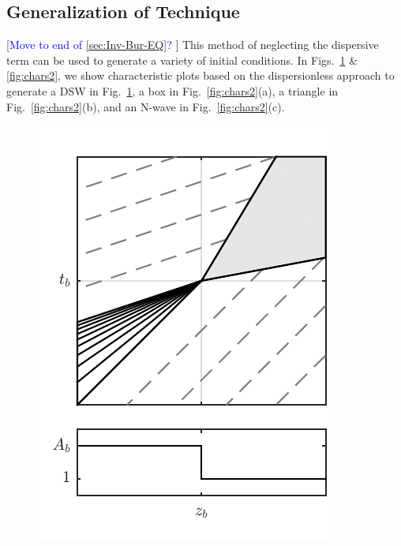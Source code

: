 \documentclass{jfm}
\newcommand{\MM}[1]{[\textcolor{blue}{#1 }]}
\begin{document}
\subsection{Generalization of Technique}\label{sec:Gen-Tech}
\MM{Move to end of \ref{sec:Inv-Bur-EQ}?}
This method of neglecting the dispersive term can be used to generate a variety of initial conditions. In Figs.~\ref{fig:chars1} \& \ref{fig:chars2}, we show characteristic plots based on the dispersionless approach to generate a DSW in Fig.~\ref{fig:chars1}, a box in Fig.~\ref{fig:chars2}(a), a triangle in Fig.~\ref{fig:chars2}(b), and an N-wave in Fig.~\ref{fig:chars2}(c).


\begin{figure}
  \centering
  \includegraphics{Figures/char_dsw.pdf}
  \caption{}
  \label{fig:chars1}
\end{figure}
\end{document}
